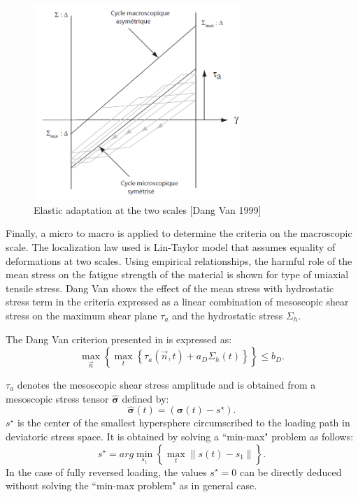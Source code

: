 \documentclass[3p,times,procedia,number]{elsarticle}
\begin{document}
\begin{figure}[!h]
	\centering
	\includegraphics[width=0.7\textwidth]{figures//DV.png} 
	\caption{Elastic adaptation at the two scales [Dang Van 1999]}
	\label{figDV}
\end{figure}
Finally, a micro to macro is applied to determine the criteria on the macroscopic scale. The localization law used is
Lin-Taylor model that assumes equality of deformations at two scales. Using empirical relationships, the harmful role of the mean stress on the fatigue
strength of the material is shown for type of uniaxial tensile stress. Dang Van shows the effect of the mean stress
with  hydrostatic stress term in the criteria expressed as a linear combination of mesoscopic  shear stress on the maximum shear plane $\tau_a$ and the hydrostatic stress $\Sigma_h$.


The Dang Van criterion presented in \cite{ballard1995high} is expressed as:
\begin{equation}
	\max \limits_{\vec{n}}\left\lbrace \max \limits_{t}\left\{\tau_a{(\vec{n},t)}+a_D\Sigma_h(t)\right\}\right\rbrace \leqslant b_D.
	\label{dv}
\end{equation}

$\tau_a$ denotes the mesoscopic shear stress amplitude and is obtained from a mesoscopic stress tensor $\hat{\bm{\sigma}}$ defined by:
$$\hat{\bm{\sigma}}(t)=(\bm{\sigma}(t)-s^\star).$$
$s^\star$ is the center of the smallest hypersphere circumscribed to the loading path in deviatoric stress space. It is obtained by solving a ``min-max" problem as follows:
$$s^\star = arg \min\limits_{s_1}\left\{\max\limits_t\parallel s(t)-s_1\parallel\right\}.$$
In the case of fully reversed loading, the values $s^\star=0$ can be directly deduced without solving the ``min-max problem" as in general case.
\end{document}
